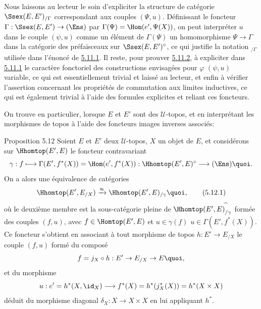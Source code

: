 \documentclass[10pt]{../fichiers-configuration-latex/smfart}
\begin{document}
Nous laissons au lecteur le soin d'expliciter la structure de
catégorie $\Ssex(E,E')_{/\Gamma}$ correspondant aux couples
$(\Psi,u)$. Définissant le foncteur $\Gamma:\Ssex(E,E')\rightarrow
(\Ens)$ par $\Gamma(\Psi)=\Hom(e',\Psi(X))$, on peut interpréter
$u$ dans le couple $(\psi,u)$ comme un élément de $\Gamma(\Psi)$
\ie un homomorphisme $\Psi\rightarrow \Gamma$ dans la catégorie
des préfaisceaux sur $\Ssex(E,E')^{\circ}$, ce qui justifie la
notation ${}_{/\Gamma}$ utilisée dans l'énoncé de
\hyperref[IV.subsubsec5.11.1]{5.11.1}. Il reste, pour prouver \hyperref[IV.lem5.11.2]{5.11.2},
à expliciter dans \hyperref[IV.subsubsec5.11.1]{5.11.1} le caractère
fonctoriel des constructions envisagées pour $\varphi$ \resp
$(\psi,u)$ variable, ce qui est essentiellement trivial et laissé
au lecteur, et enfin à vérifier l'assertion concernant les
propriétés de commutation aux limites inductives, ce qui est
également trivial à l'aide des formules explicites
 et  reliant ces foncteurs.

On trouve en particulier, lorsque $E$ et $E'$ sont des
$𝒰$-topos, et en interprétant les morphismes de topos à
l'aide des foncteurs images inverses associés:

\begin{enonce*}{Proposition 5.12}
Soient $E$ et $E'$ deux $𝒰$-topos, $X$ un objet de $E$, et
considérons sur $\Hhomtop(E',E)$ le foncteur contravariant
$$
\gamma:f\longmapsto
\Gamma(E',f^{\ast}(X))=\Hom(e',f^{\ast}(X)):\Hhomtop(E',E)^{\circ}\longrightarrow
(\Ens){\quoi}.
$$
On a alors une équivalence de catégories
\begin{equation*}
\Hhomtop(E',E_{/X})\xrightarrow{\approx}\Hhomtop(E',E)_{/\gamma}{\quoi},\tag{5.12.1}
\end{equation*}
où \pageoriginale le deuxième membre est la sous-catégorie
pleine de $\Hhomtop(E',E)^{\widehat{\phantom{,}}}_{/\gamma}$
formée des couples $(f,u)$, avec $f\in \Homtop(E',E)$ et $u\in
\gamma(f)$ \ie $u\in \Gamma(E',f^{\ast}(X))$. Ce foncteur s'obtient
en associant à tout morphisme de topos $h:E'\rightarrow E_{/X}$ le
couple $(f,u)$ formé du composé
$$
f=j_X\circ h:E'\rightarrow E_{/X}\rightarrow E{\quoi},
$$
et du morphisme
$$
u:e'=h^{\ast}(X,\id_X)\longrightarrow
f^{\ast}(X)=h^{\ast}(j^{\ast}_X(X))=h^{\ast}(X\times X)
$$
déduit du morphisme diagonal $\delta_X:X\rightarrow X\times X$ en
lui appliquant $h^{\ast}$.
\end{enonce*}
\end{document}

